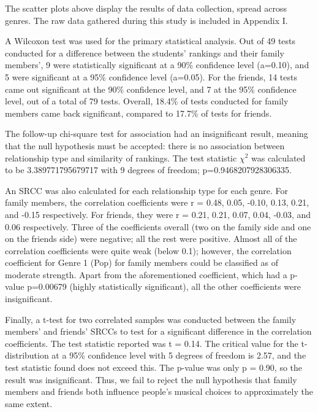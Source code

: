 \documentclass[12pt]{report}
\begin{document}
The scatter plots above display the results of data collection, spread across genres. The raw data gathered during this study is included in Appendix I.

A Wilcoxon test was used for the primary statistical analysis. Out of 49 tests conducted for a difference between the students' rankings and their family members', 9 were statistically significant at a 90\% confidence level (a=0.10), and 5 were significant at a 95\% confidence level (a=0.05). For the friends, 14 tests came out significant at the 90\% confidence level, and 7 at the 95\% confidence level, out of a total of 79 tests. Overall, 18.4\% of tests conducted for family members came back significant, compared to 17.7\% of tests for friends.

The follow-up chi-square test for association had an insignificant result, meaning that the null hypothesis must be accepted: there is no association between relationship type and similarity of rankings. The test statistic $\chi^2$ was calculated to be 3.389771795679717 with 9 degrees of freedom; p=0.9468207928306335.

An SRCC was also calculated for each relationship type for each genre. For family members, the correlation coefficients were r = 0.48, 0.05, -0.10, 0.13, 0.21, and -0.15 respectively. For friends, they were r = 0.21, 0.21, 0.07, 0.04, -0.03, and 0.06 respectively. Three of the coefficients overall (two on the family side and one on the friends side) were negative; all the rest were positive. Almost all of the correlation coefficients were quite weak (below 0.1); however, the correlation coefficient for Genre 1 (Pop) for family members could be classified as of moderate strength. Apart from the aforementioned coefficient, which had a p-value p=0.00679 (highly statistically significant), all the other coefficients were insignificant.

Finally, a t-test for two correlated samples was conducted between the family members' and friends' SRCCs to test for a significant difference in the correlation coefficients. The test statistic reported was t = 0.14. The critical value for the t-distribution at a 95\% confidence level with 5 degrees of freedom is 2.57, and the test statistic found does not exceed this. The p-value was only p = 0.90, so the result was insignificant. Thus, we fail to reject the null hypothesis that family members and friends both influence people's musical choices to approximately the same extent.
\end{document}
